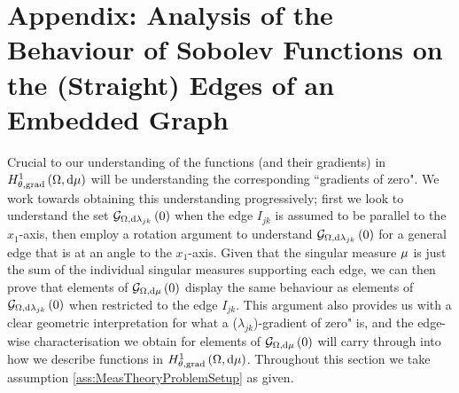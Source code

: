 
\section{Appendix: Analysis of the Behaviour of Sobolev Functions on the (Straight) Edges of an Embedded Graph} \label{app:muAnalysis}
Crucial to our understanding of the functions (and their gradients) in $H^1_{\theta, \mathrm{grad}}\left( \Omega, \mathrm{d}\mu \right)$ will be understanding the corresponding ``gradients of zero".
We work towards obtaining this understanding progressively; first we look to understand the set $\mathcal{G}_{ \Omega, \mathrm{d}\lambda_{jk}}\left( 0 \right)$ when the edge $I_{jk}$ is assumed to be parallel to the $x_1$-axis, then employ a rotation argument to understand $\mathcal{G}_{ \Omega, \mathrm{d}\lambda_{jk}}\left( 0 \right)$ for a general edge that is at an angle to the $x_1$-axis.
Given that the singular measure $\mu$ is just the sum of the individual singular measures supporting each edge, we can then prove that elements of $\mathcal{G}_{ \Omega, \mathrm{d}\mu}\left( 0 \right)$ display the same behaviour as elements of $\mathcal{G}_{ \Omega, \mathrm{d}\lambda_{jk}}\left( 0 \right)$ when restricted to the edge $I_{jk}$.
This argument also provides us with a clear geometric interpretation for what a ($\lambda_{jk}$)-gradient of zero" is, and the edge-wise characterisation we obtain for elements of $\mathcal{G}_{ \Omega, \mathrm{d}\mu}\left( 0 \right)$ will carry through into how we describe functions in $H^1_{\theta, \mathrm{grad}}\left( \Omega, \mathrm{d}\mu \right)$.
Throughout this section we take assumption \ref{ass:MeasTheoryProblemSetup} as given.

